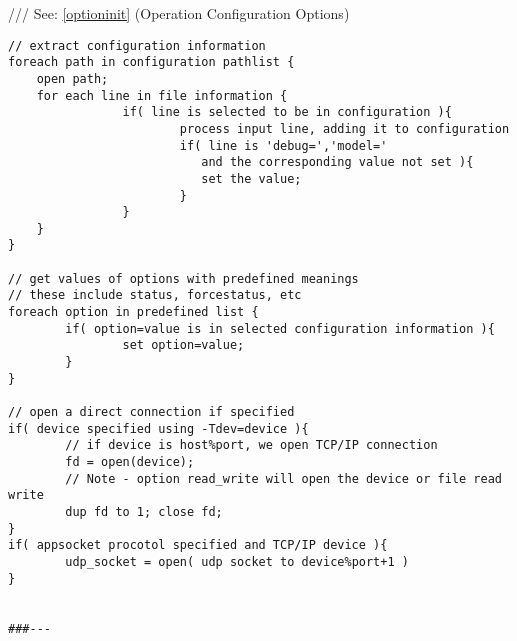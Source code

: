 \documentclass[a4paper]{article}
\begin{document}
{\ttfamily ///} See: \ref{optioninit} {(Operation Configuration Options)}
\begin{tscreen}
\begin{verbatim}
// extract configuration information
foreach path in configuration pathlist {
    open path;
    for each line in file information {
                if( line is selected to be in configuration ){
                        process input line, adding it to configuration
                        if( line is 'debug=','model='
                           and the corresponding value not set ){
                           set the value;
                        }
                }
    }
}

// get values of options with predefined meanings
// these include status, forcestatus, etc
foreach option in predefined list {
        if( option=value is in selected configuration information ){
                set option=value;
        }
}

// open a direct connection if specified
if( device specified using -Tdev=device ){
        // if device is host%port, we open TCP/IP connection
        fd = open(device);
        // Note - option read_write will open the device or file read write
        dup fd to 1; close fd;
}
if( appsocket procotol specified and TCP/IP device ){
        udp_socket = open( udp socket to device%port+1 )
}


###---
\end{verbatim}
\end{tscreen}
\end{document}
